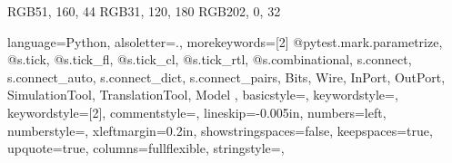 
\definecolor{dmlgreen}    {RGB}{51,  160,  44}
\definecolor{dmlblue}     {RGB}{31,  120, 180}
\definecolor{dmlred}      {RGB}{202,   0,  32}


\lstset
{%
  language=Python,%
  alsoletter={.},
  morekeywords=[2]{
    @pytest.mark.parametrize,
    @s.tick,
    @s.tick_fl,
    @s.tick_cl,
    @s.tick_rtl,
    @s.combinational,
    s.connect,
    s.connect_auto,
    s.connect_dict,
    s.connect_pairs,
    Bits,
    Wire,
    InPort,
    OutPort,
    SimulationTool,
    TranslationTool,
    Model
  },
  basicstyle={\ttfamily\footnotesize},%
  keywordstyle={\color{cbxgreenC}},%
  keywordstyle={[2]\color{cbxblueC}},%
  commentstyle={\color{cbxredC}},
  lineskip={-0.005in},%
  numbers={left},%
  numberstyle={\tiny},%
  xleftmargin={0.2in},%
  showstringspaces={false},%
  keepspaces={true},%
  upquote={true},%
  columns={fullflexible},%
  stringstyle={\color{brown}},%
}%


